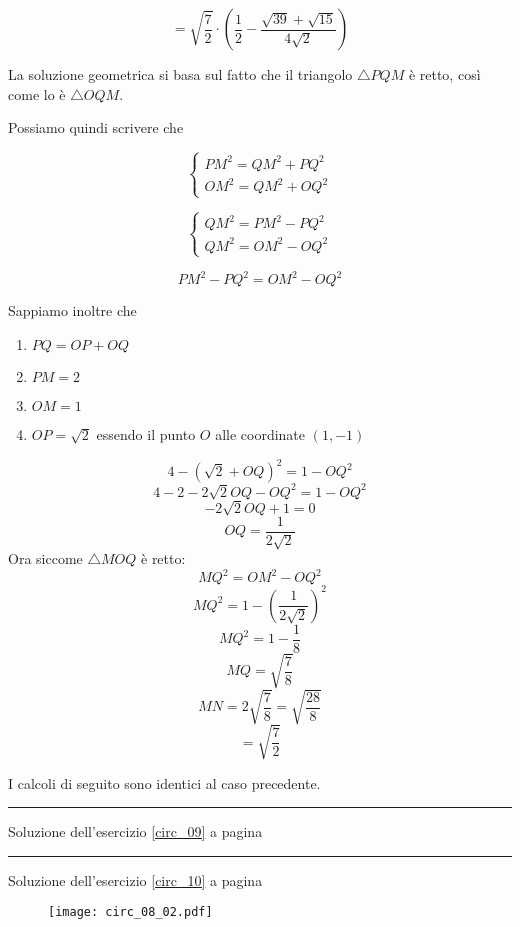 \[
=\sqrt{\frac{7}{2}}\cdot\left(
\frac{1}{2}
-
\frac{\sqrt{39}+\sqrt{15}}{4\sqrt{2}}
\right)
\]

La soluzione geometrica si basa sul fatto che il triangolo 
$\triangle PQM$ è retto, così come lo è $\triangle OQM$. 

Possiamo quindi scrivere che 

\[
\left\{
\begin{array}{ll}
PM^2=QM^2+PQ^2
\\
OM^2=QM^2+OQ^2
\end{array}
\right.
\]

\[
\left\{
\begin{array}{ll}
QM^2=PM^2-PQ^2
\\
QM^2=OM^2-OQ^2
\end{array}
\right.
\]

\[PM^2-PQ^2=OM^2-OQ^2\]

Sappiamo inoltre che
\begin{enumerate}
\item $PQ=OP+OQ$
\item $PM=2$
\item $OM=1$
\item $OP=\sqrt{2}$ essendo il punto $O$ alle coordinate $(1,-1)$
\end{enumerate}



\[4-(\sqrt{2}+OQ)^2=1-OQ^2\]
\[4-2-2\sqrt{2}OQ-OQ^2=1-OQ^2\]
\[-2\sqrt{2}OQ+1=0\]
\[OQ=\frac{1}{2\sqrt{2}}\]
Ora siccome $\triangle MOQ$ è retto:
\[MQ^2=OM^2-OQ^2\]
\[MQ^2=1-\left(\frac{1}{2\sqrt{2}}\right)^2\]
\[MQ^2=1-\frac{1}{8}\]
\[MQ=\sqrt{\frac{7}{8}}\]
\[MN=2\sqrt{\frac{7}{8}}=\sqrt{\frac{28}{8}}\]
\[=\sqrt{\frac{7}{2}}\]

I calcoli di seguito sono identici al caso precedente.



\vspace{1cm}
\hrule
\vspace{1cm}


Soluzione dell'esercizio \ref{circ_09} a pagina \pageref{circ_09}\label{circs_09}

\vspace{1cm}
\hrule
\vspace{1cm}


Soluzione dell'esercizio \ref{circ_10} a pagina \pageref{circ_10}\label{circs_10}

\begin{figure}[H]
\centering
\texttt{[image: circ\_08\_02.pdf]}
\end{figure}

